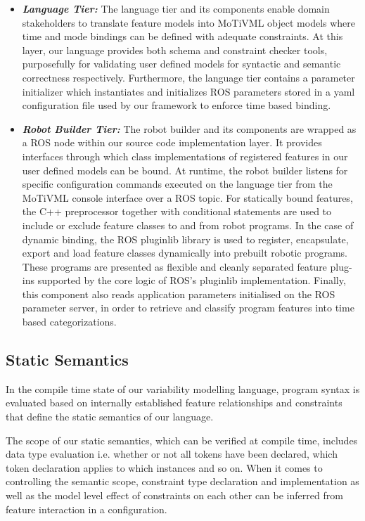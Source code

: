 \documentclass[conference]{IEEEtran}
\begin{document}
\begin{itemize}
	\item \textit{\textbf{Language Tier:}}
	The language tier and its components enable domain stakeholders to translate feature models into MoTiVML object models where time and mode bindings can be defined with adequate constraints. At this layer, our language provides both schema and constraint checker tools, purposefully for validating user defined models for syntactic and semantic correctness respectively. Furthermore, the language tier contains a parameter initializer which instantiates and initializes ROS parameters stored in a yaml configuration file used by our framework to enforce time based binding.
	\item \textit{\textbf{Robot Builder Tier:}}
	The robot builder and its components are wrapped as a ROS node within our source code implementation layer. It provides interfaces through which class implementations of registered features in our user defined models can be bound. At runtime, the robot builder listens for specific configuration commands executed on the language tier from the MoTiVML console interface over a ROS topic. For statically bound features, the C++ preprocessor together with conditional statements are used to include or exclude feature classes to and from robot programs.  In the case of dynamic binding, the ROS pluginlib library is used to register, encapsulate, export and load feature classes dynamically into prebuilt robotic programs. These programs are presented as flexible and cleanly separated feature plug-ins supported by the core logic of ROS's pluginlib implementation. Finally, this component also reads application parameters initialised on the ROS parameter server, in order to retrieve and classify program features into time based categorizations. 
\end{itemize}


\subsection{Static Semantics}
In the compile time state of our variability modelling language, program syntax is evaluated based on internally established feature relationships and constraints that define the static semantics of our language.

The scope of our static semantics, which can be verified  at compile time, includes data type evaluation i.e. whether or not all tokens have been declared, which token declaration applies to which instances and so on. When it comes to controlling the semantic scope, constraint type declaration and implementation as well as the model level effect of constraints on each other can be inferred from feature interaction in a configuration.
\end{document}
